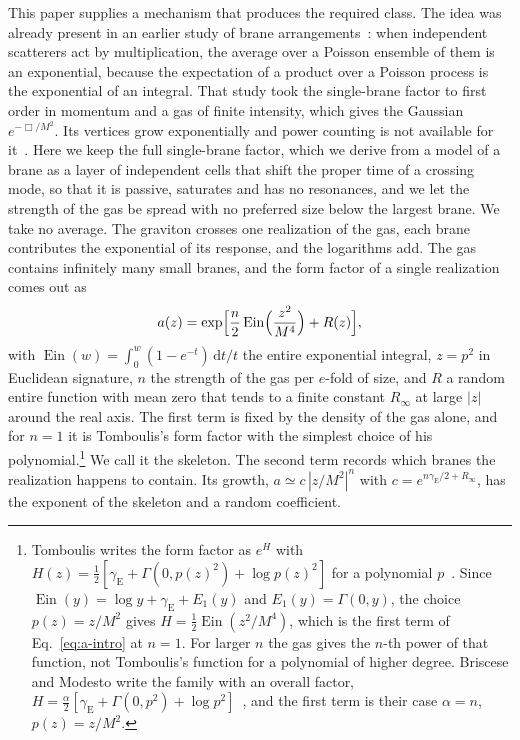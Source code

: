 \documentclass[a4paper,11pt]{article}
\newcommand{\dd}{\mathrm{d}}
\newcommand{\Ein}{\operatorname{Ein}}
\newcommand{\gE}{\gamma_{\mathrm E}}
\begin{document}
This paper supplies a mechanism that produces the required class. The idea was already present in an earlier study of brane arrangements~\cite{Bhattacharjee2026}: when independent scatterers act by multiplication, the average over a Poisson ensemble of them is an exponential, because the expectation of a product over a Poisson process is the exponential of an integral. That study took the single-brane factor to first order in momentum and a gas of finite intensity, which gives the Gaussian $e^{-\Box/M^2}$. Its vertices grow exponentially and power counting is not available for it~\cite{Talaganis2015}. Here we keep the full single-brane factor, which we derive from a model of a brane as a layer of independent cells that shift the proper time of a crossing mode, so that it is passive, saturates and has no resonances, and we let the strength of the gas be spread with no preferred size below the largest brane. We take no average. The graviton crosses one realization of the gas, each brane contributes the exponential of its response, and the logarithms add. The gas contains infinitely many small branes, and the form factor of a single realization comes out as
\begin{equation}
\label{eq:a-intro}
a(z)=\exp\Bigl[\frac n2\Ein\Bigl(\frac{z^2}{M^4}\Bigr)+R(z)\Bigr],
\end{equation}
with $\Ein(w)=\int_0^w(1-e^{-t})\,\dd t/t$ the entire exponential integral, $z=p^2$ in Euclidean signature, $n$ the strength of the gas per $e$-fold of size, and $R$ a random entire function with mean zero that tends to a finite constant $R_\infty$ at large $|z|$ around the real axis. The first term is fixed by the density of the gas alone, and for $n=1$ it is Tomboulis's form factor with the simplest choice of his polynomial.\footnote{Tomboulis writes the form factor as $e^{H}$ with $H(z)=\frac12[\gE+\Gamma(0,p(z)^2)+\log p(z)^2]$ for a polynomial $p$~\cite{Tomboulis1997}. Since $\Ein(y)=\log y+\gE+E_1(y)$ and $E_1(y)=\Gamma(0,y)$, the choice $p(z)=z/M^2$ gives $H=\frac12\Ein(z^2/M^4)$, which is the first term of Eq.~\eqref{eq:a-intro} at $n=1$. For larger $n$ the gas gives the $n$-th power of that function, not Tomboulis's function for a polynomial of higher degree. Briscese and Modesto write the family with an overall factor, $H=\frac\alpha2[\gE+\Gamma(0,p^2)+\log p^2]$~\cite{BrisceseModesto2019}, and the first term is their case $\alpha=n$, $p(z)=z/M^2$.} We call it the skeleton. The second term records which branes the realization happens to contain. Its growth, $a\simeq c\,|z/M^2|^{n}$ with $c=e^{n\gE/2+R_\infty}$, has the exponent of the skeleton and a random coefficient.
\end{document}
